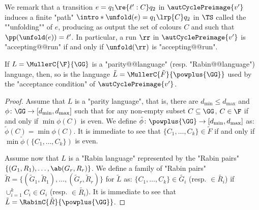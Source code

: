 \documentclass{theoretics}
\begin{document}

\AP We remark that a transition $e=q_1 \re{\ell':C }q_2$ in $\autCyclePreimage{v'}$ induces a finite "path"  $\intro*\unfold(e) = q_1\lrp{C}q_2$ in $\TS$ called the ""unfolding"" of $e$, producing as output the set of colours $C$ and such that $\pp(\unfold(e)) = \ell'$. In particular, a run $\rr$ in $\autCyclePreimage{v'}$ is "accepting@@run" if and only if $\unfold(\rr)$ is "accepting@@run".

\begin{lemma}\label{lemma-acd:same_kind_condition-automaton-precycles}
	If $L = \MullerC{\F}{\GG}$ is a "parity@@language" (resp. "Rabin@@language") language, then, so is the language $\tilde{L} = \MullerC{\tilde{F}}{\powplus{\GG}}$ used by the "acceptance condition" of $\autCyclePreimage{v'}$. 
\end{lemma}
\begin{proof}
	Assume that $L$ is a "parity language", that is, there are $d_{\min}\leq d_{\max}$ and $\phi\colon \GG \to [d_{\min}, d_{\max}]$ such that for any non-empty subset $C\subseteq \GG$, $C\in \F$ if and only if $\min \phi(C)$ is even. We define $\tilde{\phi}\colon \powplus{\GG} \to [d_{\min}, d_{\max}]$ as: $\tilde{\phi}(C) = \min \phi(C)$. It is immediate to see that $\{C_1,\dots, C_k\} \in \tilde{F}$ if and only if $\min \tilde{\phi}(\{C_1,\dots, C_k\})$ is even.
	
	Assume now that $L$ is a "Rabin language" represented by the "Rabin pairs" $\{(G_1, R_1), \dots, \ab(G_r, R_r)\}$. We define a family of "Rabin pairs" $\tilde{R} = \{(\tilde{G}_1, \tilde{R}_1), \dots, (\tilde{G}_r, \tilde{R}_r)\}$ for $\tilde{L}$ as: $\{C_1, \dots, C_k\} \in \tilde{G_i}$ (resp. $\in\tilde{R_i}$) if $\cup_{i=1}^k C_i \in G_i$ (resp. $\in\tilde{R_i}$). It is immediate to see that $\tilde{L} = \RabinC{\tilde{R}}{\powplus{\GG}}$.
\end{proof}


\end{document}
